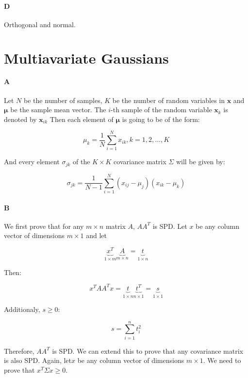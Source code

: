 \documentclass[12pt]{article}
\begin{document}
\paragraph{D} Orthogonal and normal.

\section{Multiavariate Gaussians}

\paragraph{A}
Let $N$ be the number of samples, $K$ be the number of random variables in $\mathbf{x}$ and $\mathbf{\mu}$ be the sample mean vector. The $i$-th sample of the random variable $\mathbf{x}_k$ is denoted by $\mathbf{x}_{ik}$ Then each element of $\mathbf{\mu}$ is going to be of the form:

\begin{equation}
\mu_k = \frac{1}{N}\displaystyle\sum_{i=1}^{N}{x_{ik}}, k=1,2,...,K
\end{equation}

And every element $\sigma_{jk}$ of the $K \times K$ covariance matrix $\Sigma$ will be given by:

\begin{equation}
\sigma_{jk}=\frac{1}{N-1}\displaystyle\sum_{i=1}^{N}{(x_{ij}-\mu_j)(x_{ik}-\mu_{k})}
\end{equation}

\paragraph{B}

We first prove that for any $m \times n$ matrix $A$, $AA^T$ is SPD. Let $x$ be any column vector of dimensions $m\times1$ and let

\[
\underbrace{x^T}_{1\times m}\underbrace{A}_{m\times n}=\underbrace{t}_{1\times n}
\]

Then:

\[
x^TAA^Tx = \underbrace{t}_{1\times n}\underbrace{t^T}_{n \times 1} = \underbrace{s}_{1\times 1}
\]

Additionaly, $s\geq 0$:

\[s = \displaystyle\sum_{i=1}^n{t_i^2}\]

Therefore, $AA^T$ is SPD. We can extend this to prove that any covariance matrix is also SPD. Again, let$x$ be any column vector of dimensions $m\times1$. We need to prove that $x^T\Sigma x \geq 0$.
\end{document}
